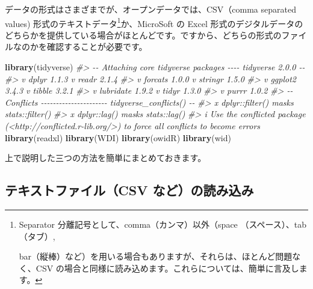 \documentclass[
  xelatex, ja=standard]{bxjsbook}
\newenvironment{Shaded}{\begin{snugshade}}{\end{snugshade}}
\newcommand{\CommentTok}[1]{\textcolor[rgb]{0.56,0.35,0.01}{\textit{#1}}}
\newcommand{\FunctionTok}[1]{\textcolor[rgb]{0.13,0.29,0.53}{\textbf{#1}}}
\newcommand{\NormalTok}[1]{#1}
\theoremstyle{definition}
\theoremstyle{definition}
\theoremstyle{definition}
\theoremstyle{definition}
\theoremstyle{remark}
\begin{document}
データの形式はさまざまでが、オープンデータでは、CSV（comma separated values) 形式のテキストデータ\footnote{Separator 分離記号として、comma（カンマ）以外（space （スペース）、tab（タブ）,

  bar（縦棒）など）を用いる場合もありますが、それらは、ほとんど問題なく、CSV の場合と同様に読み込めます。これらについては、簡単に言及します。}か、MicroSoft の Excel 形式のデジタルデータのどちらかを提供している場合がほとんどです。ですから、どちらの形式のファイルなのかを確認することが必要です。

\begin{Shaded}
\begin{Highlighting}[]
\FunctionTok{library}\NormalTok{(tidyverse)}
\CommentTok{\#\textgreater{} {-}{-} Attaching core tidyverse packages {-}{-}{-}{-} tidyverse 2.0.0 {-}{-}}
\CommentTok{\#\textgreater{} v dplyr     1.1.3     v readr     2.1.4}
\CommentTok{\#\textgreater{} v forcats   1.0.0     v stringr   1.5.0}
\CommentTok{\#\textgreater{} v ggplot2   3.4.3     v tibble    3.2.1}
\CommentTok{\#\textgreater{} v lubridate 1.9.2     v tidyr     1.3.0}
\CommentTok{\#\textgreater{} v purrr     1.0.2     }
\CommentTok{\#\textgreater{} {-}{-} Conflicts {-}{-}{-}{-}{-}{-}{-}{-}{-}{-}{-}{-}{-}{-}{-}{-}{-}{-}{-}{-}{-}{-} tidyverse\_conflicts() {-}{-}}
\CommentTok{\#\textgreater{} x dplyr::filter() masks stats::filter()}
\CommentTok{\#\textgreater{} x dplyr::lag()    masks stats::lag()}
\CommentTok{\#\textgreater{} i Use the conflicted package (\textless{}http://conflicted.r{-}lib.org/\textgreater{}) to force all conflicts to become errors}
\FunctionTok{library}\NormalTok{(readxl)}
\FunctionTok{library}\NormalTok{(WDI)}
\FunctionTok{library}\NormalTok{(owidR)}
\FunctionTok{library}\NormalTok{(wid)}
\end{Highlighting}
\end{Shaded}

上で説明した三つの方法を簡単にまとめておきます。

\hypertarget{ux30c6ux30adux30b9ux30c8ux30d5ux30a1ux30a4ux30ebcsv-ux306aux3069ux306eux8aadux307fux8fbcux307f}{%
\subsection{テキストファイル（CSV など）の読み込み}\label{ux30c6ux30adux30b9ux30c8ux30d5ux30a1ux30a4ux30ebcsv-ux306aux3069ux306eux8aadux307fux8fbcux307f}}
\end{document}
